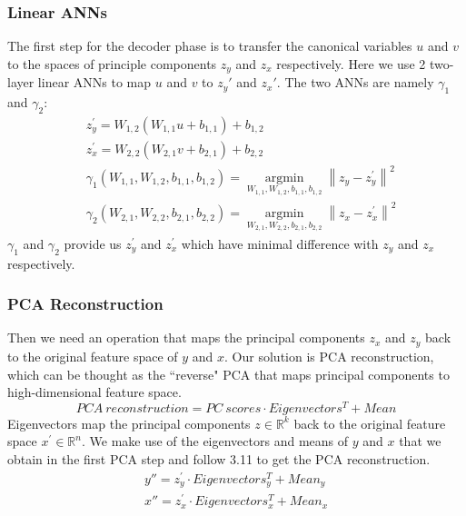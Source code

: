 \documentclass[12pt]{report} %
\newcommand{\norm}[1]{\left\lVert #1 \right\rVert}
\begin{document}
\subsubsection{Linear ANNs}
The first step for the decoder phase is to transfer the canonical variables $u$ and $v$ to the spaces of principle components $z_y$ and $z_x$ respectively. Here we use 2 two-layer linear ANNs to map $u$ and $v$ to $z_y{'}$ and $z_x{'}$. The two ANNs are namely $\gamma_1$ and $\gamma_2$:
\begin{equation}
\begin{split}
&z_y^{'}=W_{1,2}(W_{1,1}u+b_{1,1})+b_{1,2} \\
&z_x^{'}=W_{2,2}(W_{2,1}v+b_{2,1})+b_{2,2} \\
&\gamma_1(W_{1,1},W_{1,2},b_{1,1},b_{1,2})=\operatorname*{argmin}_{W_{1,1},W_{1,2},b_{1,1},b_{1,2}}\norm{z_y-z_y^{'}}^2 \\
&\gamma_2(W_{2,1},W_{2,2},b_{2,1},b_{2,2})=\operatorname*{argmin}_{W_{2,1},W_{2,2},b_{2,1},b_{2,2}}\norm{z_x-z_x^{'}}^2
\end{split}
\end{equation}
$\gamma_1$ and $\gamma_2$ provide us $z_y^{'}$ and $z_x^{'}$ which have minimal difference with $z_y$ and $z_x$ respectively.

\subsubsection{PCA Reconstruction}
Then we need an operation that maps the principal components $z_x$ and $z_y$ back to the original feature space of $y$ and $x$. Our solution is PCA reconstruction, which can be thought as the ``reverse" PCA that maps principal components to high-dimensional feature space.
\begin{equation}
PCA\ reconstruction=PC\ scores \cdot Eigenvectors^T + Mean
\end{equation}
Eigenvectors map the principal components $z\in \mathbb{R}^{k}$ back to the original feature space $x^{'}\in \mathbb{R}^{n}$. We make use of the eigenvectors and means of $y$ and $x$ that we obtain in the first PCA step and follow 3.11 to get the PCA reconstruction.
\begin{equation}
\begin{split}
y''= z_y^{'}\cdot Eigenvectors_{y}^T + Mean_y \\
x''= z_x^{'}\cdot Eigenvectors_{x}^T + Mean_x
\end{split}
\end{equation}
\end{document}
